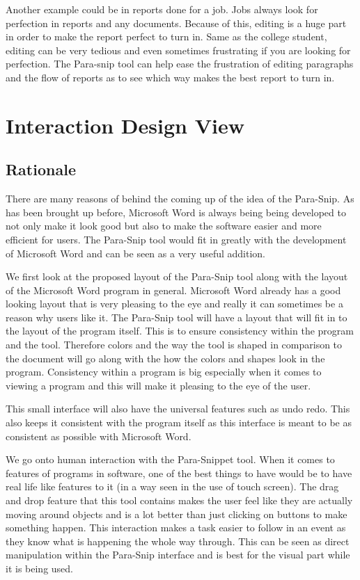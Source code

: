 \documentclass{article}
\begin{document}
	Another example could be in reports done for a job. Jobs always look for perfection in reports and any documents. Because of this, editing is a huge part in order to make the report perfect to turn in. Same as the college student, editing can be very tedious and even sometimes frustrating if you are looking for perfection. The Para-snip tool can help ease the frustration of editing paragraphs and the flow of reports as to see which way makes the best report to turn in. 

\section{Interaction Design View}

\subsection{Rationale}
	There are many reasons of behind the coming up of the idea of the Para-Snip. As has been brought up before, Microsoft Word is always being being developed to not only make it look good but also to make the software easier and more efficient for users. The Para-Snip tool would fit in greatly with the development of Microsoft Word and can be seen as a very useful addition.
	
	We first look at the proposed layout of the Para-Snip tool along with the layout of the Microsoft Word program in general. Microsoft Word already has a good looking layout that is very pleasing to the eye and really it can sometimes be a reason why users like it. The Para-Snip tool will have a layout that will fit in to the layout of the program itself. This is to ensure consistency within the program and the tool. Therefore colors and the way the tool is shaped in comparison to the document will go along with the how the colors and shapes look in the program. Consistency within a program is big especially when it comes to viewing a program and this will make it pleasing to the eye of the user.
	
	This small interface will also have the universal features such as undo redo. This also keeps it consistent with the program itself as this interface is meant to be as consistent as possible with Microsoft Word.
	
	We go onto human interaction with the Para-Snippet tool. When it comes to features of programs in software, one of the best things to have would be to have real life like features to it (in a way seen in the use of touch screen). The drag and drop feature that this tool contains makes the user feel like they are actually moving around objects and is a lot better than just clicking on buttons to make something happen. This interaction makes a task easier to follow in an event as they know what is happening the whole way through. This can be seen as direct manipulation within the Para-Snip interface and is best for the visual part while it is being used.
	
\end{document}
